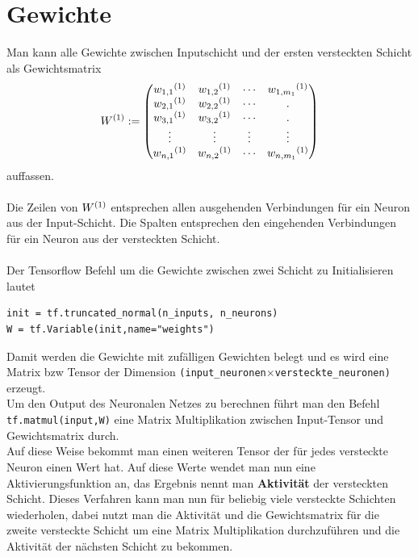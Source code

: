 \section{Gewichte}
Man kann alle Gewichte zwischen Inputschicht und der ersten versteckten Schicht als Gewichtsmatrix \begin{equation}
W\textsuperscript{(1)}:=
\begin{pmatrix}
w_{1,1}\textsuperscript{(1)} & w_{1,2}\textsuperscript{(1)} & \cdots & w_{1,m_1}\textsuperscript{(1)} \\
w_{2,1}\textsuperscript{(1)} & w_{2,2}\textsuperscript{(1)}& \cdots & .\\
w_{3,1}\textsuperscript{(1)} & w_{3,2}\textsuperscript{(1)}& \cdots & .\\
\vdots & \vdots & \vdots & \vdots \\
w_{n,1}\textsuperscript{(1)} & w_{n,2}\textsuperscript{(1)} & \cdots & w_{n,m_1}\textsuperscript{(1)}\\
\end{pmatrix} \end{equation}
auffassen.\\\\
Die Zeilen von $W\textsuperscript{(1)}$ entsprechen allen ausgehenden Verbindungen für ein Neuron aus der Input-Schicht. Die Spalten entsprechen den eingehenden Verbindungen für ein Neuron aus der versteckten Schicht. \\\\
Der Tensorflow Befehl um die Gewichte zwischen zwei Schicht zu Initialisieren lautet\cite{handson}
\begin{lstlisting}
init = tf.truncated_normal(n_inputs, n_neurons)
W = tf.Variable(init,name="weights")
\end{lstlisting}
Damit werden die Gewichte mit zufälligen Gewichten belegt und es wird eine Matrix bzw Tensor der Dimension \lstinline$(input_neuronen$$ \times $\lstinline$versteckte_neuronen)$ erzeugt.\\
Um den Output des Neuronalen Netzes zu berechnen führt man den Befehl\\ \lstinline$tf.matmul(input,W)$ eine Matrix Multiplikation zwischen Input-Tensor und Gewichtsmatrix durch.\cite{handson} \\
Auf diese Weise bekommt man einen weiteren Tensor der für jedes versteckte Neuron einen Wert hat. Auf diese Werte wendet man nun eine Aktivierungsfunktion an, das Ergebnis nennt man \textbf{Aktivit\"at}\cite{Ertel2013} der versteckten Schicht. Dieses Verfahren kann man nun für beliebig viele versteckte Schichten wiederholen, dabei nutzt man die Aktivität und die Gewichtsmatrix für die zweite versteckte Schicht um eine Matrix Multiplikation durchzuführen und die Aktivität der nächsten Schicht zu bekommen.
